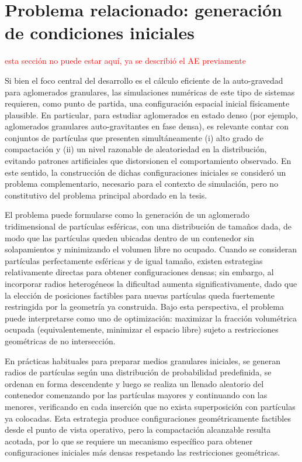 \documentclass[a4paper,11pt]{book}
\newcommand{\red}[1]{\textcolor{red}{#1}}
\begin{document}
\section{Problema relacionado: generación de condiciones iniciales}
\label{sec:condiciones_iniciales}
\red{esta sección no puede estar aquí, ya se describió el AE previamente}

Si bien el foco central del desarrollo es el cálculo eficiente de la auto-gravedad para aglomerados granulares, las simulaciones numéricas de este tipo de sistemas requieren, como punto de partida, una configuración espacial inicial físicamente plausible. En particular, para estudiar aglomerados en estado denso (por ejemplo, aglomerados granulares auto-gravitantes en fase densa), es relevante contar con conjuntos de partículas que presenten simultáneamente (i) alto grado de compactación y (ii) un nivel razonable de aleatoriedad en la distribución, evitando patrones artificiales que distorsionen el comportamiento observado. En este sentido, la construcción de dichas configuraciones iniciales se consideró un problema complementario, necesario para el contexto de simulación, pero no constitutivo del problema principal abordado en la tesis.

El problema puede formularse como la generación de un aglomerado tridimensional de partículas esféricas, con una distribución de tamaños dada, de modo que las partículas queden ubicadas dentro de un contenedor sin solapamientos y minimizando el volumen libre no ocupado. Cuando se consideran partículas perfectamente esféricas y de igual tamaño, existen estrategias relativamente directas para obtener configuraciones densas; sin embargo, al incorporar radios heterogéneos la dificultad aumenta significativamente, dado que la elección de posiciones factibles para nuevas partículas queda fuertemente restringida por la geometría ya construida. Bajo esta perspectiva, el problema puede interpretarse como uno de optimización: maximizar la fracción volumétrica ocupada (equivalentemente, minimizar el espacio libre) sujeto a restricciones geométricas de no intersección.

En prácticas habituales para preparar medios granulares iniciales, se generan radios de partículas según una distribución de probabilidad predefinida, se ordenan en forma descendente y luego se realiza un llenado aleatorio del contenedor comenzando por las partículas mayores y continuando con las menores, verificando en cada inserción que no exista superposición con partículas ya colocadas. Esta estrategia produce configuraciones geométricamente factibles desde el punto de vista operativo, pero la compactación alcanzable resulta acotada, por lo que se requiere un mecanismo específico para obtener configuraciones iniciales más densas respetando las restricciones geométricas.
\end{document}
